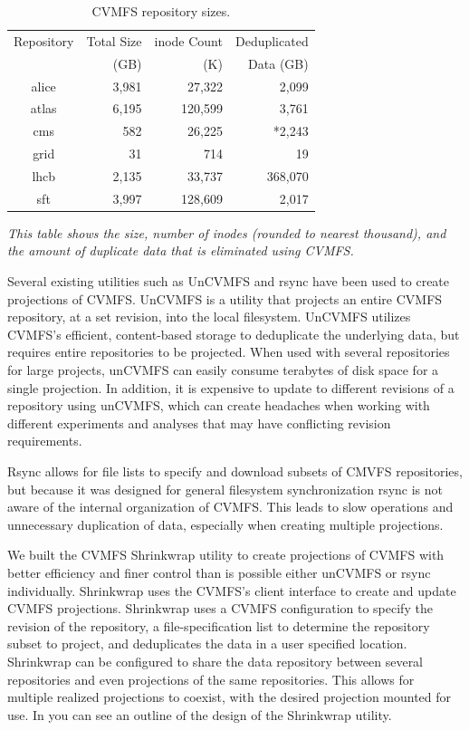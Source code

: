 \documentclass[sigconf]{acmart}
\begin{document}
\begin{table}
\begin{center}
\begin{tabular}{|c|r r r|}
\hline
Repository & Total Size & inode Count & Deduplicated \\
 & (GB) & (K) & Data (GB) \\ \hline
alice & 3,981 & 27,322 & 2,099 \\
atlas & 6,195 & 120,599 & 3,761 \\
cms & 582 & 26,225 & *2,243\\
grid & 31 & 714 & 19 \\
lhcb & 2,135 & 33,737 & 368,070 \\
sft & 3,997 & 128,609 & 2,017 \\ 
 \hline
\end{tabular}
\caption{CVMFS repository sizes.}
\label{tab:repo-sizes}
{\small \it This table shows the size, number of inodes (rounded to nearest thousand), and the amount
of duplicate data that is eliminated using CVMFS.}
\end{center}
\end{table}

Several existing utilities such as UnCVMFS and 
rsync have been used to create projections of CVMFS.
UnCVMFS is a utility that projects an entire
CVMFS repository, at a set revision, into the local
filesystem. 
UnCVMFS utilizes CVMFS's efficient, content-based storage
to deduplicate the underlying data, but requires
entire repositories to be projected.
When used with several repositories for large projects,
unCVMFS can easily consume terabytes of disk space for a single projection.
In addition, it is expensive to update to different revisions of a repository using unCVMFS,
which can create headaches when working with different experiments and analyses that may have conflicting revision requirements.

Rsync allows for file lists to specify and download
subsets of CMVFS repositories, but because it
was designed for general filesystem synchronization
rsync is not aware of the internal organization of CVMFS.
This leads to slow operations and unnecessary duplication of data,
especially when creating multiple projections.

We built the CVMFS Shrinkwrap utility to create projections of CVMFS with better efficiency and finer control than is possible either unCVMFS or rsync individually.
Shrinkwrap uses the CVMFS's client interface to
create and update CVMFS projections.
Shrinkwrap uses a CVMFS configuration to specify the
revision of the repository, a file-specification list
to determine the repository subset to project, and
deduplicates the data in a user specified location.
Shrinkwrap can be configured to share the data
repository between several repositories and even
projections of the same repositories.
This allows for multiple realized projections
to coexist, with the desired projection
mounted for use.
In  you can see an outline
of the design of the Shrinkwrap utility.
\end{document}
